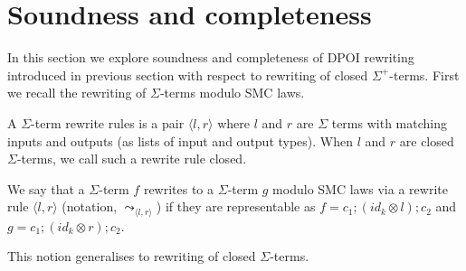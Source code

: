 \section{Soundness and completeness}

In this section we explore soundness and completeness of DPOI rewriting introduced in previous section with respect to rewriting of closed $\Sigma^{+}$-terms.
First we recall the rewriting of $\Sigma$-terms modulo SMC laws.

\begin{definition}
A $\Sigma$-term rewrite rules is a pair $\langle l, r \rangle$ where $l$ and $r$ are $\Sigma$ terms with matching inputs and outputs (as lists of input and output types).
When $l$ and $r$ are closed $\Sigma$-terms, we call such a rewrite rule closed.
\end{definition}

\begin{definition}
	\label{def:rewrite}
	We say that a $\Sigma$-term $f$ rewrites to a $\Sigma$-term $g$ modulo SMC laws via a rewrite rule $\langle l, r \rangle$ (notation, $\leadsto_{\langle l, r \rangle}$) if they are representable as
	$
		f = c_{1};(id_{k} \otimes l);c_{2} $ and $ g = c_{1};(id_{k} \otimes r);c_{2}
	$.
\end{definition}
This notion generalises to rewriting of closed $\Sigma$-terms.

